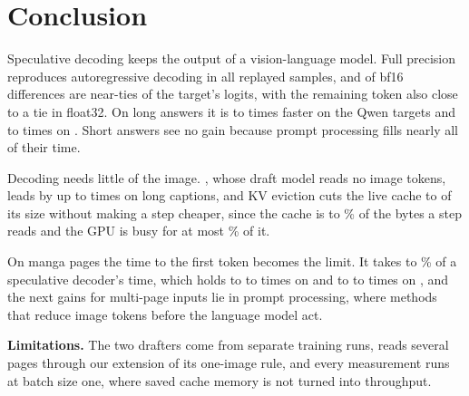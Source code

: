 \section{Conclusion}
\label{sec:conclusion}

Speculative decoding keeps the output of a vision-language model.
Full precision reproduces autoregressive decoding in all \fpqAll replayed samples, and \diagNearAll of \diagCasesAll bf16 differences are near-ties of the target's logits, with the remaining token also close to a tie in float32.
On long answers it is \sbLongTextvqaVisSpeedMin to \sbLongCocoHivSpeedMax times faster on the Qwen targets and \llavaLongGqaSpeedup to \llavaLongTextvqaSpeedup times on \llava. Short answers see no gain because prompt processing fills nearly all of their time.

Decoding needs little of the image.
\hivis, whose draft model reads no image tokens, leads \vispec by up to \sbLongCocoHovMax times on long captions, and KV eviction cuts the live cache to \spEvictKvMin of its size without making a step cheaper, since the cache is \costTbThousand to \costTbSevenThousand\% of the bytes a step reads and the GPU is busy for at most \profileBusyMax\% of it.

On manga pages the time to the first token becomes the limit.
It takes \tbPagesShareMin to \sbPagesHivShare\% of a speculative decoder's time, which holds \vispec to \tbPagesSpeedMin to \tbPagesSpeedMax times on \qwenS and \hivis to \sbPagesHivSpeedMin to \sbPagesHivSpeedMax times on \qwenL, and the next gains for multi-page inputs lie in prompt processing, where methods that reduce image tokens before the language model act.

\noindent\textbf{Limitations.}
The two drafters come from separate training runs, \hivis reads several pages through our extension of its one-image rule, and every measurement runs at batch size one, where saved cache memory is not turned into throughput.
